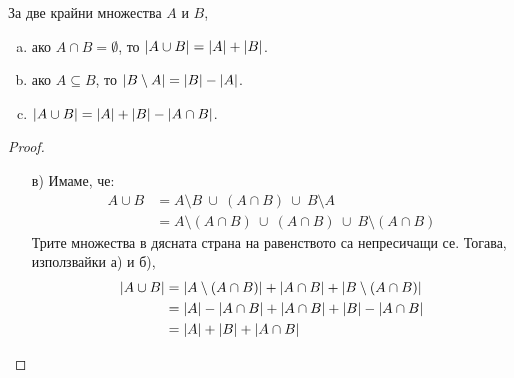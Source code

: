 \begin{prop}
  За две крайни множества $A$ и $B$,
  \begin{enumerate}[a)]
  \item 
    ако $A \cap B = \emptyset$, то $\lvert{A\cup B}\rvert = \lvert{A}\rvert + \lvert{B}\rvert$.
  \item
    ако $A\subseteq B$, то $\lvert{B\setminus A}\rvert = \lvert{B}\rvert - \lvert{A}\rvert$.
  \item
    $\lvert{A\cup B}\rvert = \lvert{A}\rvert + \lvert{B}\rvert - \lvert{A\cap B}\rvert$.
  \end{enumerate}
\end{prop}
\begin{proof}
  \begin{enumerate}[a)]
  \item[в)]
    Имаме, че:
    \begin{align*}
      A\cup B & = A \setminus B\ \cup\ (A\cap B)\ \cup\ B\setminus A\\
      & = A\setminus (A\cap B)\ \cup\ (A\cap B)\ \cup\ B\setminus (A\cap B)
    \end{align*}
    Трите множества в дясната страна на равенството са непресичащи се.
    Тогава, използвайки а) и б), 
    \begin{align*}
      \lvert{A \cup B}\rvert & = \lvert{ A\setminus (A\cap B)}\rvert + \lvert{A\cap B}\rvert + \lvert{B\setminus (A\cap B)}\rvert\\
      & = \lvert{A}\rvert - \lvert{A\cap B}\rvert + \lvert{A \cap B}\rvert + \lvert{B}\rvert - \lvert{A\cap B}\rvert\\
      & = \lvert{A}\rvert + \lvert{B}\rvert + \lvert{A \cap B}\rvert
    \end{align*}
  \end{enumerate}
\end{proof}

